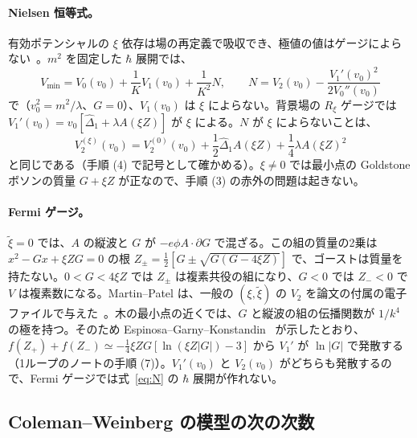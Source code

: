 \documentclass[a4paper,10pt]{ltjsarticle}
\begin{document}
\paragraph{Nielsen 恒等式。}有効ポテンシャルの $\xi$ 依存は場の再定義で吸収でき、極値の値はゲージによらない~\cite{nielsen75,ahnote}。$m^2$ を固定した $\hbar$ 展開では、
\begin{equation}
V_{\min}=V_0(v_0)+\frac1KV_1(v_0)+\frac1{K^2}N,\qquad N=V_2(v_0)-\frac{V_1'(v_0)^2}{2V_0''(v_0)}
\label{eq:N}
\end{equation}
で（$v_0^2=m^2/\lambda$、$G=0$）、$V_1(v_0)$ は $\xi$ によらない。背景場の $R_\xi$ ゲージでは $V_1'(v_0)=v_0[\hat\Delta_1+\lambda A(\xi Z)]$ が $\xi$ による。$N$ が $\xi$ によらないことは、
\begin{equation}
V_2^{(\xi)}(v_0)=V_2^{(0)}(v_0)+\frac12\hat\Delta_1A(\xi Z)+\frac14\lambda A(\xi Z)^2
\label{eq:nielsen2}
\end{equation}
と同じである（手順 (4) で記号として確かめる）。$\xi\ne0$ では最小点の Goldstone ボソンの質量 $G+\xi Z$ が正なので、手順 (3) の赤外の問題は起きない。

\paragraph{Fermi ゲージ。}$\tilde\xi=0$ では、$A$ の縦波と $G$ が $-e\phi A\!\cdot\!\partial G$ で混ざる。この組の質量の2乗は $x^2-Gx+\xi ZG=0$ の根 $Z_\pm=\frac12[G\pm\sqrt{G(G-4\xi Z)}]$ で、ゴーストは質量を持たない。$0<G<4\xi Z$ では $Z_\pm$ は複素共役の組になり、$G<0$ では $Z_-<0$ で $V$ は複素数になる。Martin--Patel は、一般の $(\xi,\tilde\xi)$ の $V_2$ を論文の付属の電子ファイルで与えた~\cite{mp18}。木の最小点の近くでは、$G$ と縦波の組の伝播関数が $1/k^4$ の極を持つ。そのため Espinosa--Garny--Konstandin~\cite{egk16} が示したとおり、$f(Z_+)+f(Z_-)\simeq-\frac14\xi ZG[\ln(\xi Z|G|)-3]$ から $V_1'$ が $\ln|G|$ で発散する（1ループのノートの手順 (7)）。$V_1'(v_0)$ と $V_2(v_0)$ がどちらも発散するので、Fermi ゲージでは式~\eqref{eq:N} の $\hbar$ 展開が作れない。

\subsection{Coleman--Weinberg の模型の次の次数}\label{sec:cwnlo}
\end{document}
